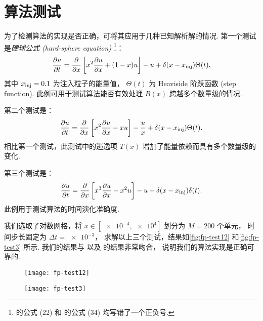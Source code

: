 \section{算法测试}

为了检测算法的实现是否正确，可将其应用于几种已知解析解的情况\cite{park1996,donnert2014}.
第一个测试是\emph{硬球公式 (hard-sphere equation)}%
\footnote{ 的公式 (22) 和  的公式 (34)
均写错了一个正负号.}：
\begin{equation}
  \label{eq:fp-test1}
  \frac{\partial u}{\partial t} = \frac{\partial }{\partial x} \left[ x^2 \frac{\partial u}{\partial x} + (1-x) u \right]
    - u + \delta(x-x_{\mathrm{inj}}) \Theta(t) ,
\end{equation}
其中 $x_{\mathrm{inj}} = 0.1$ 为注入粒子的能量值，
$\Theta(t)$ 为 Heaviside 阶跃函数 (step function).
此例可用于测试算法能否有效处理 $B(x)$ 跨越多个数量级的情况.

第二个测试是：
\begin{equation}
  \label{eq:fp-test2}
  \frac{\partial u}{\partial t} = \frac{\partial }{\partial x} \left[ x^2 \frac{\partial u}{\partial x} - x u \right]
    - \frac{u}{x} + \delta(x-x_{\mathrm{inj}}) \Theta(t) .
\end{equation}
相比第一个测试，此测试中的逃逸项 $T(x)$ 增加了能量依赖而具有多个数量级的变化.

第三个测试是：
\begin{equation}
  \label{eq:fp-test3}
  \frac{\partial u}{\partial t} = \frac{\partial }{\partial x} \left[ x^3 \frac{\partial u}{\partial x} - x^2 u \right]
    - u + \delta(x-x_{\mathrm{inj}}) \delta(t) .
\end{equation}
此例用于测试算法的时间演化准确度.

我们选取了对数网格，将 $x \in [\num{e-4}, \num{e4}]$ 划分为 $M=200$ 个单元，
时间步长固定为 $\Delta t = \num{e-3}$，
求解以上三个测试，结果如\autoref{fig:fp-test12} 和\autoref{fig:fp-test3} 所示.
我们的结果与  以及  的结果非常吻合，
说明我们的算法实现是正确可靠的.

\begin{figure}[htp]
  \centering
  \texttt{[image: fp-test12]}
  \label{fig:fp-test12}
\end{figure}

\begin{figure}[htp]
  \centering
  \texttt{[image: fp-test3]}
  \label{fig:fp-test3}
\end{figure}



